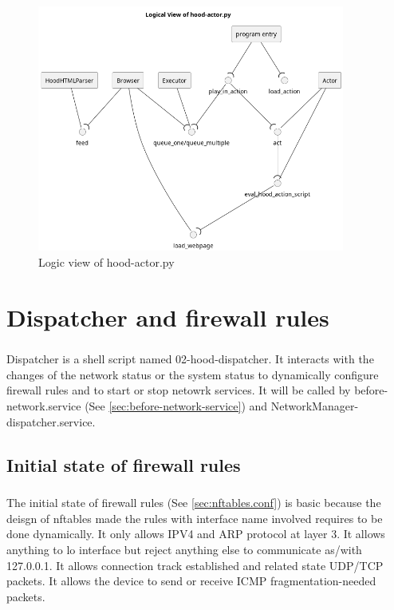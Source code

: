 \documentclass[mscthesis]{usiinfthesis}
\begin{document}
\begin{figure}[H]
  \includegraphics[width=0.9\textwidth]{graphics/puml/actor.png}
  \caption{Logic view of hood-actor.py}
  \label{fig:actor-logic-view}
\end{figure}

\chapter{Dispatcher and firewall rules}\label{cha:dispatcher}
\paragraph{}
Dispatcher is a shell script named 02-hood-dispatcher. It interacts with the changes of the network status or the system status to dynamically configure firewall rules and to start or stop netowrk services. It will be called by before-network.service (See \cref{sec:before-network-service}) and NetworkManager-dispatcher.service.

\section{Initial state of firewall rules}
\paragraph{}
The initial state of firewall rules (See \cref{sec:nftables.conf}) is basic because the deisgn of nftables made the rules with interface name involved requires to be done dynamically. It only allows IPV4 and ARP protocol at layer 3. It allows anything to lo interface but reject anything else to communicate as/with 127.0.0.1. It allows connection track established and related state UDP/TCP packets. It allows the device to send or receive ICMP fragmentation-needed packets.
\end{document}
